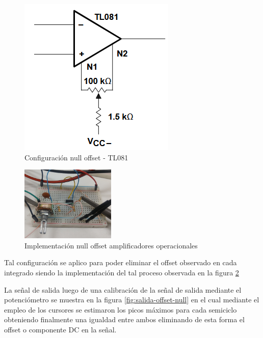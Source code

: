 \begin{figure}[h]
\begin{minipage}{0.3\linewidth}
		\includegraphics[width=\linewidth]{media/offset-null-081}
		\caption{Configuración null offset - TL081}
		\label{fig:offset-null-081}
	\end{minipage}
\end{figure} 

\begin{figure}[h]
	\centering
	\includegraphics[width=0.4\textwidth]{media/implementacion-null-offset}
	\caption{Implementación null offset amplificadores operacionales}
	\label{fig:implementacion-null-offset}
\end{figure}

Tal configuración se aplico para poder eliminar el offset observado en cada integrado siendo la implementación del tal proceso observada en la figura \ref{fig:implementacion-null-offset}

La señal de salida luego de una calibración de la señal de salida mediante el potenciómetro se muestra en la figura \ref{fig:salida-offset-null} en el cual mediante el empleo de los cursores se estimaron los picos máximos para cada semiciclo obteniendo finalmente una igualdad entre ambos eliminando de esta forma el offset o componente DC en la señal.

